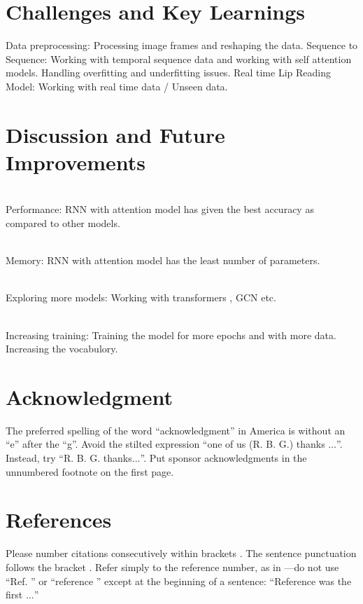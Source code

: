 \documentclass[conference]{IEEEtran}
\begin{document}

\section{Challenges and Key Learnings}
 Data preprocessing: Processing image frames and reshaping the data.
 Sequence to Sequence: Working with temporal sequence data and working with self attention models.
 Handling overfitting and underfitting issues.
 Real time Lip Reading Model: Working with real time data / Unseen data.
\section{Discussion and Future Improvements}
\\ Performance: RNN with attention model has given the best accuracy as compared to other models. 

\\ Memory: RNN with attention model has the least number of parameters.

\\ Exploring more models: Working with transformers , GCN etc.

\\ Increasing training: Training the model for more epochs and with more data. Increasing the vocabulory.
\section*{Acknowledgment}

The preferred spelling of the word ``acknowledgment'' in America is without 
an ``e'' after the ``g''. Avoid the stilted expression ``one of us (R. B. 
G.) thanks $\ldots$''. Instead, try ``R. B. G. thanks$\ldots$''. Put sponsor 
acknowledgments in the unnumbered footnote on the first page.

\section*{References}

Please number citations consecutively within brackets \cite{b1}. The 
sentence punctuation follows the bracket \cite{b2}. Refer simply to the reference 
number, as in \cite{b3}---do not use ``Ref. \cite{b3}'' or ``reference \cite{b3}'' except at 
the beginning of a sentence: ``Reference \cite{b3} was the first $\ldots$''
\end{document}
